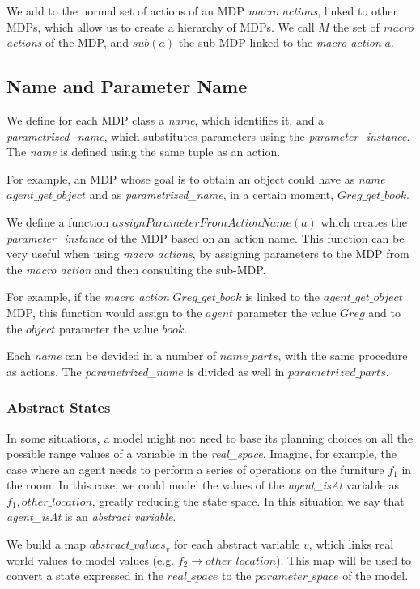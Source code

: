 We add to the normal set of actions of an MDP \textit{macro actions}, linked to other MDPs, which allow us to create a hierarchy of MDPs. We call $M$ the set of \textit{macro actions} of the MDP, and $sub(a)$ the sub-MDP linked to the \textit{macro action} $a$.

\subsection{Name and Parameter Name}
We define for each MDP class a \textit{name}, which identifies it, and a \textit{parametrized\_name}, which substitutes parameters using the \textit{parameter\_instance}. The \textit{name} is defined using the same tuple as an action. 

For example, an MDP whose goal is to obtain an object could have as \textit{name} $agent\_get\_object$ and as \textit{parametrized\_name}, in a certain moment, $Greg\_get\_book$.

We define a function $assignParameterFromActionName(a)$ which creates the \textit{parameter\_instance} of the MDP based on an action name. This function can be very useful when using \textit{macro actions}, by assigning parameters to the MDP from the \textit{macro action} and then consulting the sub-MDP.

For example, if the \textit{macro action} $Greg\_get\_book$ is linked to the $agent\_get\_object$ MDP, this function would assign to the $agent$ parameter the value $Greg$ 
and to the $object$ parameter the value $book$.

Each \textit{name} can be devided in a number of $name\_parts$,  with the same procedure as actions. The \textit{parametrized\_name} is divided as well in $parametrized\_parts$.


\subsubsection{Abstract States}

In some situations, a model might not need to base its planning choices on all the possible range values of a variable in the \textit{real\_space}. Imagine, for example, the case where an agent needs to perform a series of operations on the furniture $f_1$ in the room. In this case, we could model the  values of the \textit{agent\_isAt} variable as ${f_1 , other\_location}$, greatly reducing the state space. In this situation we say that \textit{agent\_isAt} is an \textit{abstract variable}. 

We build a map $abstract\_values_v$ for each abstract variable $v$, which links real world values to model values (e.g. $f_2 \rightarrow other\_location$). This map will be used to convert a state expressed in the $real\_space$ to the $parameter\_space$ of the model. 

